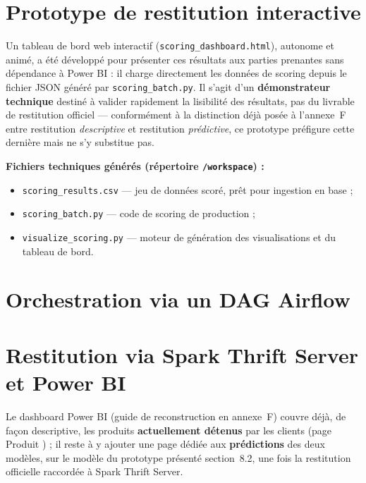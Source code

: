 \documentclass[11pt,a4paper]{report}
\begin{document}
\section{Prototype de restitution interactive}
Un tableau de bord web interactif (\texttt{scoring\_dashboard.html}),
autonome et animé, a été développé pour présenter ces résultats aux
parties prenantes sans dépendance à Power BI : il charge directement les
données de scoring depuis le fichier JSON généré par
\texttt{scoring\_batch.py}. Il s'agit d'un \textbf{démonstrateur
technique} destiné à valider rapidement la lisibilité des résultats,
pas du livrable de restitution officiel — conformément à la distinction
déjà posée à l'annexe~F entre restitution \textit{descriptive} et
restitution \textit{prédictive}, ce prototype préfigure cette dernière
mais ne s'y substitue pas.

\textbf{Fichiers techniques générés (répertoire \texttt{/workspace}) :}
\begin{itemize}
  \item \texttt{scoring\_results.csv} — jeu de données scoré, prêt pour
  ingestion en base ;
  \item \texttt{scoring\_batch.py} — code de scoring de production ;
  \item \texttt{visualize\_scoring.py} — moteur de génération des
  visualisations et du tableau de bord.
\end{itemize}

\section{Orchestration via un DAG Airflow}

\section{Restitution via Spark Thrift Server et Power BI}
\statutAVenir{}
Le dashboard Power BI (guide de reconstruction en annexe~F) couvre déjà,
de façon descriptive, les produits \textbf{actuellement détenus} par les
clients (page \og Produit \fg) ; il reste à y ajouter une page dédiée aux
\textbf{prédictions} des deux modèles, sur le modèle du prototype
présenté section~8.2, une fois la restitution officielle raccordée à
Spark Thrift Server.
\end{document}
